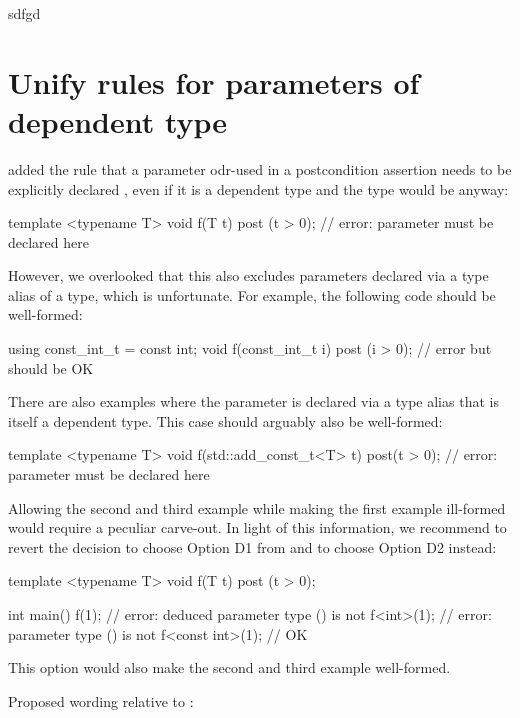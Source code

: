 sdfgd

\section{Unify rules for parameters of dependent type}

\cite{P3489R0} added the rule that a parameter odr-used in a postcondition assertion needs to be explicitly declared , even if it is a dependent type and the type would be  anyway:

\begin{codeblock}
template <typename T>
void f(T t) post (t > 0);  // error: parameter must be declared  here
\end{codeblock}

However, we overlooked that this also excludes parameters declared via a type alias of a  type, which is unfortunate. For example, the following code should be well-formed:

\begin{codeblock}
using const_int_t = const int;
void f(const_int_t i) post (i > 0);  // error but should be OK
\end{codeblock}

There are also examples where the parameter is declared via a type alias that is itself a dependent type. This case should arguably also be well-formed:

\begin{codeblock}
template <typename T>
void f(std::add_const_t<T> t) post(t > 0);  // error: parameter must be declared  here
\end{codeblock}

Allowing the second and third example while making the first example ill-formed would require a peculiar carve-out. In light of this information, we recommend to revert the decision to choose Option D1 from \cite{P3489R0} and to choose Option D2 instead:
\begin{codeblock}
template <typename T>
void f(T t) post (t > 0);  

int main() {
  f(1);              // error: deduced parameter type () is not 
  f<int>(1);         // error: parameter type () is not 
  f<const int>(1);   // OK
}
\end{codeblock}
This option would also make the second and third example well-formed.

Proposed wording relative to \cite{P2900R11}:


